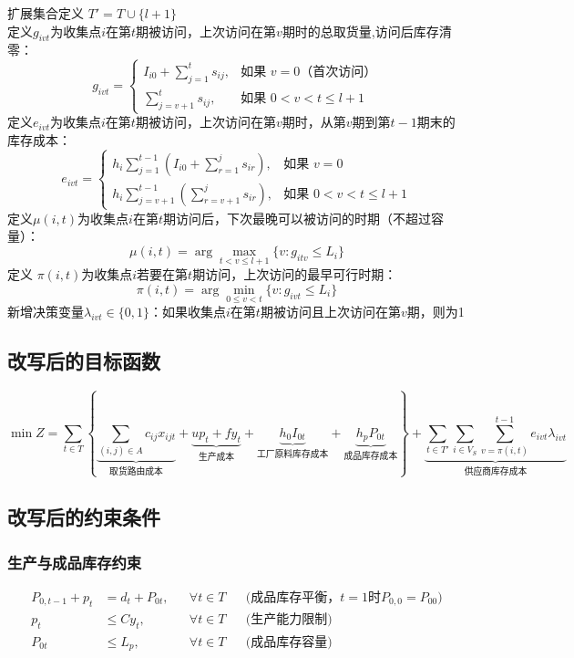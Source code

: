 \documentclass{article}
\begin{document}
\newpage
\noindent
扩展集合定义 $T' = T \cup \{l+1\}$ \\
定义$g_{ivt}$为收集点$i$在第$t$期被访问，上次访问在第$v$期时的总取货量,访问后库存清零：
\begin{equation*}
g_{ivt} = \begin{cases}
I_{i0} + \sum_{j=1}^{t} s_{ij}, & \text{如果 } v = 0 \text{（首次访问）}\\
\sum_{j=v+1}^{t} s_{ij}, & \text{如果 } 0 < v < t \leq l+1
\end{cases}
\end{equation*}
定义$e_{ivt}$为收集点$i$在第$t$期被访问，上次访问在第$v$期时，从第$v$期到第$t-1$期末的库存成本：
\begin{equation*}
e_{ivt} = \begin{cases}
h_i \sum_{j=1}^{t-1} \left(I_{i0} + \sum_{r=1}^{j} s_{ir}\right), & \text{如果 } v = 0 \\
h_i \sum_{j=v+1}^{t-1} \left(\sum_{r=v+1}^{j} s_{ir}\right), & \text{如果 } 0 < v < t \leq l+1
\end{cases}
\end{equation*}
定义$\mu(i,t)$为收集点$i$在第$t$期访问后，下次最晚可以被访问的时期（不超过容量）：
\[\mu(i,t) = \arg\max_{t<v\leq l+1}\{v : g_{itv} \leq L_i\} \]
定义 $\pi(i,t)$为收集点$i$若要在第$t$期访问，上次访问的最早可行时期：
\[\pi(i,t) = \arg\min_{0\leq v<t}\{v : g_{ivt} \leq L_i\} \]
新增决策变量$\lambda_{ivt} \in \{0,1\}$：如果收集点$i$在第$t$期被访问且上次访问在第$v$期，则为1


\subsection{改写后的目标函数}
\begin{equation}
\min Z = \sum_{t \in T} \left\{
\underbrace{\sum_{(i,j) \in A} c_{ij} x_{ijt}}_{\text{取货路由成本}}
+ \underbrace{u p_t + f y_t}_{\text{生产成本}}
+ \underbrace{h_0 I_{0t}}_{\text{工厂原料库存成本}}
+ \underbrace{h_p P_{0t}}_{\text{成品库存成本}}
\right\}
+ \underbrace{\sum_{t \in T'} \sum_{i \in V_S} \sum_{v=\pi(i,t)}^{t-1} e_{ivt}\lambda_{ivt}}_{\text{供应商库存成本}}
\end{equation}

\subsection{改写后的约束条件}

\subsubsection{生产与成品库存约束}
\vspace{-1.5ex}
\begin{align}
P_{0,t-1} + p_t &= d_t + P_{0t}, && \forall t \in T && \text{(成品库存平衡，$t=1$时$P_{0,0}=P_{00}$)} \\
p_t &\leq C y_t, && \forall t \in T && \text{(生产能力限制)} \\
P_{0t} &\leq L_p, && \forall t \in T && \text{(成品库存容量)}
\end{align}
\end{document}
